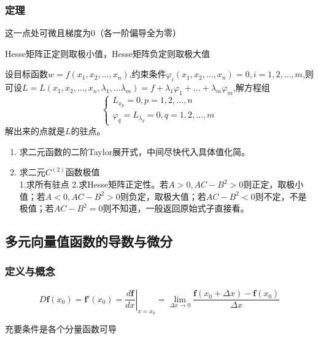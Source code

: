 \subsubsection{定理}
\begin{theorem}[极值的必要条件]
	这一点处可微且梯度为0（各一阶偏导全为零）
\end{theorem}
\begin{theorem}[极值的充分条件]
	Hesse矩阵正定则取极小值，Hesse矩阵负定则取极大值
\end{theorem}
\begin{theorem}[条件极值与Lagrange乘数法]
	设目标函数$ w=f(x_1,x_2,...,x_n) $,约束条件$ \varphi_i(x_1,x_2,...,x_n)=0,i=1,2,...,m $,则可设$ L=L(x_1,x_2,...,x_n,\lambda_1,...\lambda_m)=f+\lambda_1\varphi_1+...+\lambda_m\varphi_m $,解方程组
	\begin{equation}\label{key}
		\begin{cases}
			L_{x_p}=0,p=1,2,...,n\\
			\varphi_q=L_{\lambda_q}=0,q=1,2,...,m
		\end{cases}
	\end{equation}
解出来的点就是$ L $的驻点。
\end{theorem}
\begin{application}
	\begin{enumerate}
	\item 求二元函数的二阶Taylor展开式，中间尽快代入具体值化简。
	\item 求二元$ C^{(2)} $函数极值\\
	1.求所有驻点
	2.求Hesse矩阵正定性。若$ A>0,AC-B^2>0 $则正定，取极小值；若$ A<0,AC-B^2>0 $则负定，取极大值；若$ AC-B^2<0 $则不定，不是极值；若$ AC-B^2=0 $则不知道，一般返回原始式子直接看。
\end{enumerate}
\end{application}

\subsection{多元向量值函数的导数与微分}
\subsubsection{定义与概念}
\begin{definition}[一元向量值函数的可导]
	\begin{equation}\label{key}
		D\bm{f}(x_0)=\bm{f}'(x_0)=\left .\dfrac{d\bm{f}}{d x}\right |_{x=x_0}=\lim\limits_{\Delta x \to 0}\dfrac{\bm{f}(x_0+\Delta x)-\bm{f}(x_0)}{\Delta x}
	\end{equation}
\end{definition}
\begin{remark}
	充要条件是各个分量函数可导
\end{remark}

